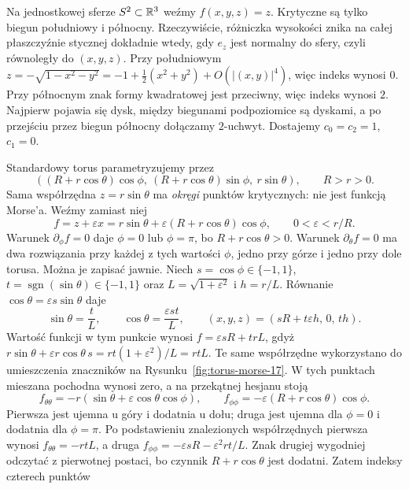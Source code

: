\begin{przyklad}
\label{prz:morse-sfera-17}
Na jednostkowej sferze $S^2\subset\mathbb{R}^3$
weźmy $f(x,y,z)=z$. Krytyczne są
tylko biegun południowy i północny.
Rzeczywiście, różniczka wysokości znika na całej płaszczyźnie
stycznej dokładnie wtedy, gdy $e_z$ jest normalny do sfery,
czyli równoległy do $(x,y,z)$.
Przy południowym
$z=-\sqrt{1-x^2-y^2}
 =-1+\tfrac12(x^2+y^2)+O(|(x,y)|^4)$,
więc indeks wynosi $0$.
Przy północnym znak formy
kwadratowej jest przeciwny,
więc indeks wynosi $2$.
Najpierw pojawia się dysk,
między biegunami podpoziomice
są dyskami, a po przejściu przez
biegun północny dołączamy
$2$-uchwyt. Dostajemy
$c_0=c_2=1$, $c_1=0$.
\end{przyklad}

\begin{przyklad}
\label{prz:morse-torus-17}
Standardowy torus parametryzujemy przez
\[
 ((R+r\cos\theta)\cos\phi,\
  (R+r\cos\theta)\sin\phi,\
  r\sin\theta),\qquad R>r>0.
\]
Sama współrzędna $z=r\sin\theta$
ma \emph{okręgi} punktów krytycznych:
nie jest funkcją Morse'a.
Weźmy zamiast niej
\[
 f=z+\varepsilon x
 =r\sin\theta+
    \varepsilon(R+r\cos\theta)\cos\phi,
 \qquad 0<\varepsilon<r/R.
\]
Warunek $\partial_\phi f=0$ daje
$\phi=0$ lub $\phi=\pi$, bo
$R+r\cos\theta>0$.
Warunek $\partial_\theta f=0$ ma
dwa rozwiązania przy każdej z tych
wartości $\phi$, jedno przy górze
i jedno przy dole torusa.
Można je zapisać jawnie. Niech $s=\cos\phi\in\{-1,1\}$,
$t=\operatorname{sgn}(\sin\theta)\in\{-1,1\}$ oraz
$L=\sqrt{1+\varepsilon^2}$ i $h=r/L$.
Równanie $\cos\theta=\varepsilon s\sin\theta$ daje
\[
 \sin\theta=\frac{t}{L},\qquad
 \cos\theta=\frac{\varepsilon st}{L},\qquad
 (x,y,z)=(sR+t\varepsilon h,\,0,\,th).
\]
Wartość funkcji w tym punkcie wynosi
$f=\varepsilon sR+trL$, gdyż
$r\sin\theta+\varepsilon r\cos\theta\,s
=rt(1+\varepsilon^2)/L=rtL$.
Te same współrzędne wykorzystano
do umieszczenia znaczników na Rysunku~\ref{fig:torus-morse-17}.
W tych punktach mieszana pochodna
wynosi zero, a na przekątnej hesjanu
stoją
\[
 f_{\theta\theta}
  =-r(\sin\theta+
       \varepsilon\cos\theta\cos\phi),
 \qquad
 f_{\phi\phi}
  =-\varepsilon(R+r\cos\theta)\cos\phi.
\]
Pierwsza jest ujemna u góry
i dodatnia u dołu; druga jest
ujemna dla $\phi=0$
i dodatnia dla $\phi=\pi$.
Po podstawieniu znalezionych współrzędnych pierwsza wynosi
$f_{\theta\theta}=-rtL$, a druga
$f_{\phi\phi}=-\varepsilon sR-\varepsilon^2rt/L$.
Znak drugiej wygodniej odczytać z pierwotnej postaci,
bo czynnik $R+r\cos\theta$ jest dodatni.
Zatem indeksy czterech punktów

\end{przyklad}
